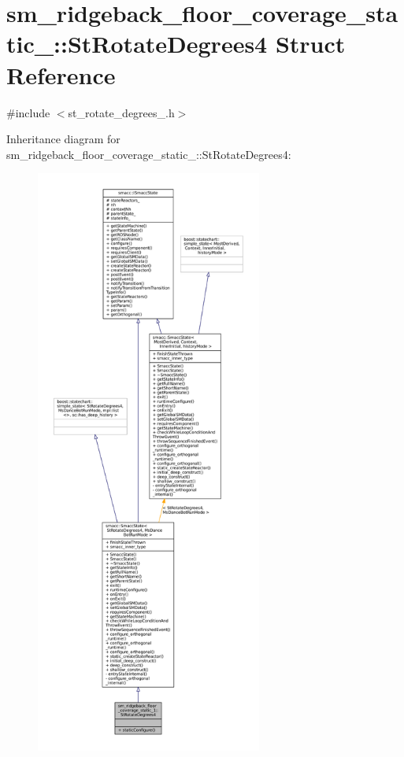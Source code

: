 \hypertarget{structsm__ridgeback__floor__coverage__static__1_1_1StRotateDegrees4}{}\section{sm\+\_\+ridgeback\+\_\+floor\+\_\+coverage\+\_\+static\+\_\+:\+:St\+Rotate\+Degrees4 Struct Reference}
\label{structsm__ridgeback__floor__coverage__static__1_1_1StRotateDegrees4}


{\ttfamily \#include $<$st\+\_\+rotate\+\_\+degrees\+\_.\+h$>$}



Inheritance diagram for sm\+\_\+ridgeback\+\_\+floor\+\_\+coverage\+\_\+static\+\_\+:\+:St\+Rotate\+Degrees4\+:
\nopagebreak
\begin{figure}[H]
\begin{center}
\leavevmode
\includegraphics[height=550pt]{structsm__ridgeback__floor__coverage__static__1_1_1StRotateDegrees4__inherit__graph}
\end{center}
\end{figure}


